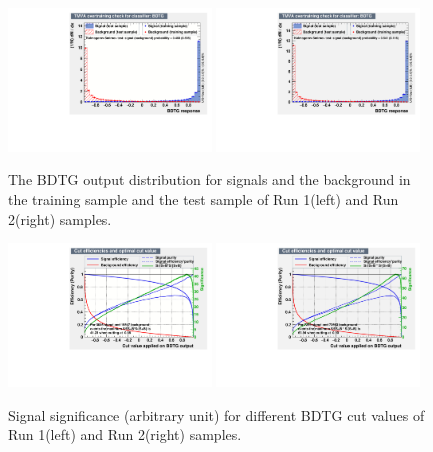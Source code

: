 \begin{figure}[!tbh]
\centering
\includegraphics[width=0.48\textwidth]{Figures/04_Penta/02_selection/tmva/plots_run1/overtrain_BDTG}
\includegraphics[width=0.48\textwidth]{Figures/04_Penta/02_selection/tmva/plots_run2/overtrain_BDTG}
\caption{
   The BDTG output distribution for signals and the background in the training sample and the test sample of Run 1(left) and Run 2(right) samples.}
\label{fig:MVAMonitor}
\end{figure}

\begin{figure}[!tbh]
\centering
\includegraphics[width=0.48\textwidth]{Figures/04_Penta/02_selection/tmva/plots_run1/mvaeffs_BDTG}
\includegraphics[width=0.48\textwidth]{Figures/04_Penta/02_selection/tmva/plots_run2/mvaeffs_BDTG}
   \caption{Signal significance (arbitrary unit) for different BDTG cut values of Run 1(left) and Run 2(right) samples.}
\label{fig:BDTGCut}
\end{figure}



